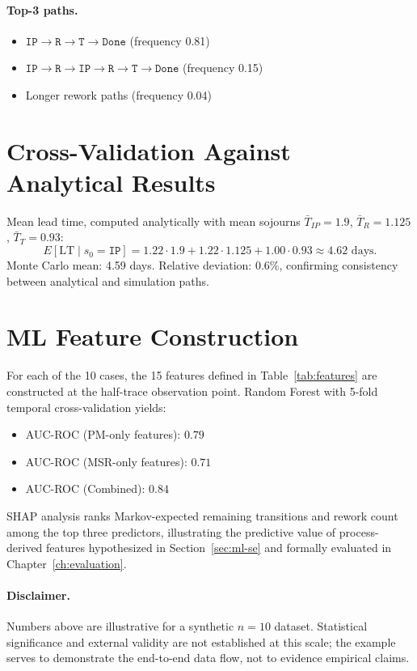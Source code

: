 \paragraph{Top-3 paths.}
\begin{itemize}
  \item $\mathtt{IP} \to \mathtt{R} \to \mathtt{T} \to \mathtt{Done}$
    (frequency 0.81)
  \item $\mathtt{IP} \to \mathtt{R} \to \mathtt{IP} \to \mathtt{R} \to
    \mathtt{T} \to \mathtt{Done}$ (frequency 0.15)
  \item Longer rework paths (frequency 0.04)
\end{itemize}


\section{Cross-Validation Against Analytical Results}
\label{app:J-validation}

Mean lead time, computed analytically with mean sojourns $\bar{T}_{IP} =
1.9$, $\bar{T}_R = 1.125$, $\bar{T}_T = 0.93$:
\begin{equation}
E[\mathrm{LT} \mid s_0 = \mathtt{IP}]
= 1.22 \cdot 1.9 + 1.22 \cdot 1.125 + 1.00 \cdot 0.93 \approx 4.62 \text{ days}.
\end{equation}
Monte Carlo mean: 4.59 days. Relative deviation: 0.6\%, confirming
consistency between analytical and simulation paths.


\section{ML Feature Construction}
\label{app:J-ml}

For each of the 10 cases, the 15 features defined in
Table~\ref{tab:features} are constructed at the half-trace observation
point. Random Forest with 5-fold temporal cross-validation yields:
\begin{itemize}
  \item AUC-ROC (PM-only features): $0.79$
  \item AUC-ROC (MSR-only features): $0.71$
  \item AUC-ROC (Combined): $0.84$
\end{itemize}
SHAP analysis ranks Markov-expected remaining transitions and rework
count among the top three predictors, illustrating the predictive value
of process-derived features hypothesized in Section~\ref{sec:ml-se} and
formally evaluated in Chapter~\ref{ch:evaluation}.

\paragraph{Disclaimer.} Numbers above are illustrative for a synthetic
$n=10$ dataset. Statistical significance and external validity are not
established at this scale; the example serves to demonstrate the
end-to-end data flow, not to evidence empirical claims.
